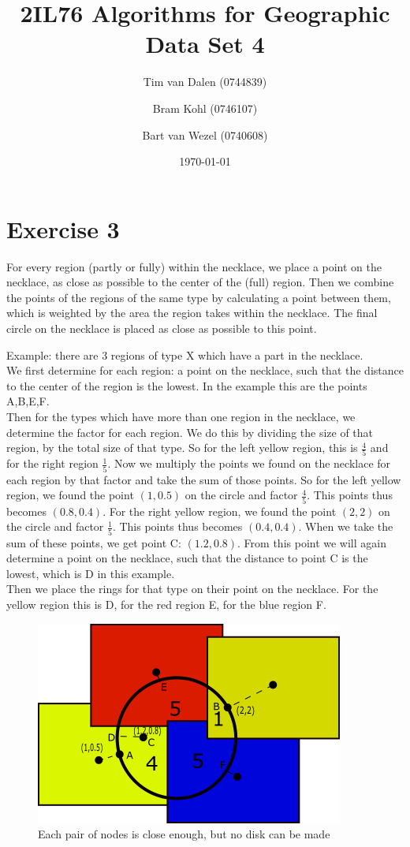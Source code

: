 \documentclass[a4paper,11pt]{article}
\title{
	2IL76 Algorithms for Geographic Data Set 4 \\
}
\author{
	Tim van Dalen (0744839)
	\and
	Bram Kohl (0746107)
	\and
	Bart van Wezel (0740608)
}
\date{\today}
\begin{document}
	\maketitle
	
\section*{Exercise 3}
For every region (partly or fully) within the necklace, we place a point on the necklace, as close as possible to the center of the (full) region. Then we combine the points of the regions of the same type by calculating a point between them, which is weighted by the area the region takes within the necklace. The final circle on the necklace is placed as close as possible to this point.

Example: there are 3 regions of type X which have a part in the necklace. \\
We first determine for each region: a point on the necklace, such that the distance to the center of the region is the lowest.
In the example this are the points A,B,E,F.  \\
Then for the types which have more than one region in the necklace, we determine the factor for each region. 
We do this by dividing the size of that region, by the total size of that type. 
So for the left yellow region, this is $\frac{4}{5}$ and for the right region $\frac{1}{5}$. 
Now we multiply the points we found on the necklace for each region by that factor and take the sum of those points. 
So for the left yellow region, we found the point $(1,0.5)$ on the circle and factor  $\frac{4}{5}$. 
This points thus becomes $(0.8,0.4)$. 
For the right yellow region, we found the point $(2,2)$ on the circle and factor  $\frac{1}{5}$. 
This points thus becomes $(0.4,0.4)$. When we take the sum of these points, we get point C: $(1.2,0.8)$.
From this point we will again determine  a point on the necklace, such that the distance to point C is the lowest, which is D in this example.  \\

Then we place the rings for that type on their point on the necklace. For the yellow region this is D, for the red region E, for the blue region F. \\
\begin{figure}[H]
	\centering
	\includegraphics{figure1.png}
	\caption{Each pair of nodes is close enough, but no disk can be made}
	\label{fig:nodisk}
\end{figure}
\end{document}
